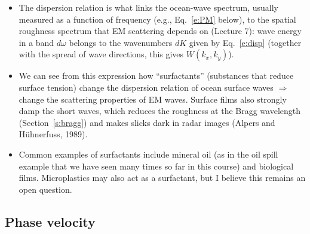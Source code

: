 \documentclass[11pt, oneside]{article}
\begin{document}
\begin{itemize}
	\item The dispersion relation is what links the ocean-wave spectrum, usually measured as a function of frequency (e.g., Eq.~\ref{e:PM} below), to the spatial roughness spectrum that EM scattering depends on (Lecture 7): wave energy in a band $d\omega$ belongs to the wavenumbers $dK$ given by Eq.~\ref{e:disp} (together with the spread of wave directions, this gives $W(k_x,k_y)$).
	\item We can see from this expression how ``surfactants'' (substances that reduce surface tension) change the dispersion relation of ocean surface waves $\Rightarrow$ change the scattering properties of EM waves. Surface films also strongly damp the short waves, which reduces the roughness at the Bragg wavelength (Section~\ref{s:bragg}) and makes slicks dark in radar images (Alpers and H\"uhnerfuss, 1989).
	\item Common examples of surfactants include mineral oil (as in the oil spill example that we have seen many times so far in this course) and biological films. Microplastics may also act as a surfactant, but I believe this remains an open question.
\end{itemize}

\subsection{Phase velocity}
\end{document}
